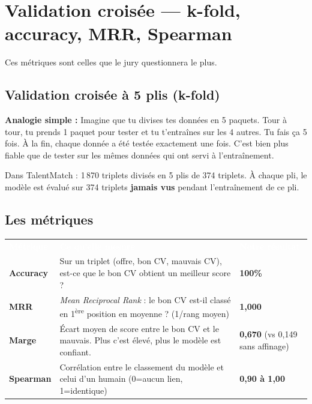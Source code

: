 \documentclass[12pt,a4paper]{article}
\newenvironment{simplification}{%
  \def\FrameCommand{\fboxsep=8pt\colorbox{green!10}}%
  \MakeFramed{\advance\hsize-\width \FrameRestore}%
  \vspace{-4pt}%
}{\endMakeFramed}
\begin{document}
\newpage

\section{Validation croisée — k-fold, accuracy, MRR, Spearman}

Ces métriques sont celles que le jury questionnera le plus.

\subsection{Validation croisée à 5 plis (k-fold)}

\begin{simplification}
\textbf{Analogie simple :}
Imagine que tu divises tes données en 5 paquets. Tour à tour, tu prends 1 paquet pour tester et tu t'entraînes sur les 4 autres. Tu fais ça 5 fois. À la fin, chaque donnée a été testée exactement une fois. C'est bien plus fiable que de tester sur les mêmes données qui ont servi à l'entraînement.
\end{simplification}

Dans TalentMatch : 1\,870 triplets divisés en 5 plis de 374 triplets. À chaque pli, le modèle est évalué sur 374 triplets \textbf{jamais vus} pendant l'entraînement de ce pli.

\subsection{Les métriques}

\begin{tabularx}{\textwidth}{p{3cm} X p{3cm}}
\rowcolor{bleu}
\textcolor{white}{\textbf{Métrique}} & \textcolor{white}{\textbf{Ce qu'elle mesure}} & \textcolor{white}{\textbf{Notre résultat}} \\
\textbf{Accuracy} & Sur un triplet (offre, bon CV, mauvais CV), est-ce que le bon CV obtient un meilleur score ? & \textbf{100\%} \\
\rowcolor{bleulight}
\textbf{MRR} & \textit{Mean Reciprocal Rank} : le bon CV est-il classé en 1\textsuperscript{ère} position en moyenne ? (1/rang moyen) & \textbf{1,000} \\
\textbf{Marge} & Écart moyen de score entre le bon CV et le mauvais. Plus c'est élevé, plus le modèle est confiant. & \textbf{0,670} (vs 0,149 sans affinage) \\
\rowcolor{bleulight}
\textbf{Spearman} & Corrélation entre le classement du modèle et celui d'un humain (0=aucun lien, 1=identique) & \textbf{0,90 à 1,00} \\
\bottomrule
\end{tabularx}
\end{document}
